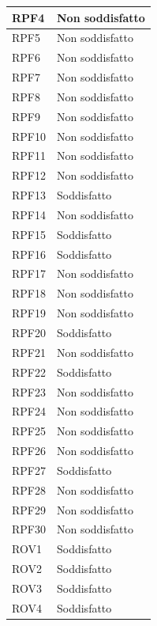 \begin{longtable}{| p{2.5cm} | p{3cm} |}
	RPF4 & Non soddisfatto \\ \hline
	RPF5 & Non soddisfatto \\ \hline
	\rowcolor{LightGray}
	RPF6 & Non soddisfatto \\ \hline
	RPF7 & Non soddisfatto \\ \hline
	\rowcolor{LightGray}
	RPF8 & Non soddisfatto \\ \hline
	RPF9 & Non soddisfatto \\ \hline
	\rowcolor{LightGray}
	RPF10 & Non soddisfatto \\ \hline
	RPF11 & Non soddisfatto \\ \hline
	\rowcolor{LightGray}
	RPF12 & Non soddisfatto \\ \hline
	RPF13 & Soddisfatto \\ \hline
	\rowcolor{LightGray}
	RPF14 & Non soddisfatto \\ \hline
	RPF15 & Soddisfatto \\ \hline
	\rowcolor{LightGray}
	RPF16 & Soddisfatto \\ \hline
	RPF17 & Non soddisfatto \\ \hline
	\rowcolor{LightGray}
	RPF18 & Non soddisfatto \\ \hline
	RPF19 & Non soddisfatto \\ \hline
	\rowcolor{LightGray}
	RPF20 & Soddisfatto \\ \hline
	RPF21 & Non soddisfatto \\ \hline
	\rowcolor{LightGray}
	RPF22 & Soddisfatto \\ \hline
	RPF23 & Non soddisfatto \\ \hline
	\rowcolor{LightGray}
	RPF24 & Non soddisfatto \\ \hline
	RPF25 & Non soddisfatto \\ \hline
	\rowcolor{LightGray}
	RPF26 & Non soddisfatto \\ \hline
	RPF27 & Soddisfatto \\ \hline
	\rowcolor{LightGray}
	RPF28 & Non soddisfatto \\ \hline
	RPF29 & Non soddisfatto \\ \hline
	\rowcolor{LightGray}
	RPF30 & Non soddisfatto \\ \hline
	ROV1 & Soddisfatto \\ \hline
	\rowcolor{LightGray}
	ROV2 & Soddisfatto \\ \hline
	ROV3 & Soddisfatto \\ \hline
	\rowcolor{LightGray}
	ROV4 & Soddisfatto \\ \hline

\end{longtable}
